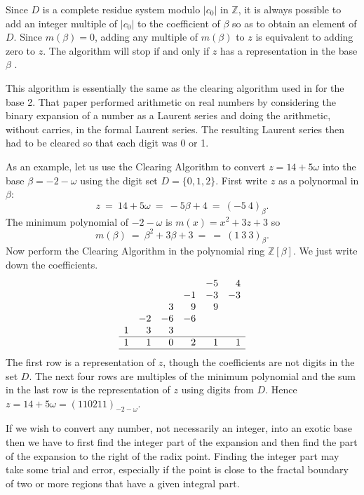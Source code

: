 \documentclass[12pt]{article}
\newcommand{\Z}{\mathbb{Z}}
\begin{document}
    Since $D$ is a complete residue system modulo $|c_0|$ in $\Z$, it is always
possible to add an integer multiple of $|c_0|$ to the coefficient of $\beta$ so as to obtain an element of $D$. 
Since $m(\beta) = 0$, adding any multiple of $m(\beta)$ to $z$
is equivalent to adding zero to $z$. The algorithm will stop if and only if $z$
has a representation in the base $\beta$ \cite{radix}.

    This algorithm is essentially the same as the clearing algorithm used in
\cite{faltin} for the base 2.  That paper performed arithmetic on real numbers by
considering the binary expansion of a number as a Laurent series and doing
the arithmetic, without carries, in the formal Laurent series. The resulting
Laurent series then had to be cleared so that each digit was 0 or 1.

    As an example, let us use the Clearing Algorithm to convert 
$z = 14 + 5\omega$
into the base $\beta = -2 - \omega$ using the digit set $D = \{0, 1, 2\}$. First write $z$ as
a polynormal in $\beta$:
$$
z \ = \ 14 + 5\omega \ = \ -5\beta+4 \ = \ (-5\ 4)_{\beta}.
$$
The minimum polynomial of $-2 - \omega$ is $m(x) = x^2 + 3z + 3$ so
$$
m(\beta) \ = \ \beta^2 + 3\beta + 3 \ = \ = \ (1\ 3 \ 3)_{\beta}.
$$
Now perform the Clearing Algorithm in the polynomial ring $\Z[\beta]$. We just
write down the coefficients.
$$
\begin{array}{rrrrrr}
 &  &  &  &-5& 4\\
 &  &  &-1&-3&-3\\
 &  & 3& 9& 9   \\
 &-2&-6&-6      \\
1& 3& 3&        \\
\hline
1& 1& 0& 2& 1& 1\\
\hline
\end{array}
$$
The first row is a representation of $z$, though the coefficients are not digits in the set $D$. The next four rows are multiples of the minimum polynomial and the sum in the last row is the representation of $z$ using digits from $D$.
Hence $z = 14 + 5\omega = (110211)_{-2 - \omega}$.

    If we wish to convert any number, not necessarily an integer, into an
exotic base then we have to first find the integer part of the expansion and
then find the part of the expansion to the right of the radix point. Finding
the integer part may take some trial and error, especially if the point is close to the fractal boundary of two or more regions that have a given integral
part.
\end{document}
